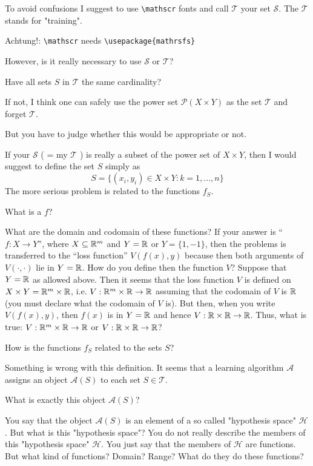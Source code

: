 \begin{description}[style=unboxed,leftmargin=0cm,itemsep=3ex]
To avoid confusions I suggest to use \verb!\mathscr! fonts and
call $\mathscr{T}$ your set $\mathcal{S}$.
The $\mathscr{T}$ stands for "training".

Achtung!: \verb!\mathscr! needs \verb!\usepackage{mathrsfs}!

However, is it really necessary to use $\mathcal{S}$ or $\mathscr{T}$?

Have all sets $S$ in $\mathscr{T}$ the same cardinality?

If not, I think one can safely use the power set $\mathscr{P}(X\times Y)$
as the set $\mathscr{T}$ and forget $\mathscr{T}$.

But you have to judge whether this would be appropriate or not.

If your $\mathcal{S}$ ( = my $\mathscr{T}$ ) is really a subset of the
power set of $X\times Y$, then I would suggest to define the set $S$
simply as
$$
S = \{ (x_i,y_i)\in X\times Y : k=1,...,n \}
$$
The more serious problem is related to the functions $f_S$.

What is a  $f$?

What are the domain and codomain of these functions?
If your answer is ``$f:X\to Y$'', where $X\subseteq{\mathbb R }^m$ and $Y={\mathbb R }$ or
$Y=\{1,-1\}$, then the problems is transferred to the ``loss function''
$V(f(x),y)$ because then both arguments of $V(\cdot,\cdot)$ lie in $Y={\mathbb R }$.
How do you define then the function $V$?
Suppose that $Y={\mathbb R }$ as allowed above.
Then it seems that the loss function $V$ is defined on
$X\times Y={\mathbb R }^m\times{\mathbb R }$, i.e. $V:{\mathbb R }^m\times{\mathbb R }\to{\mathbb R }$ assuming that the
codomain of $V$ is ${\mathbb R }$ (you must declare what the codomain of $V$ is).
But then, when you write $V(f(x),y)$, then $f(x)$ is in $Y={\mathbb R }$ and
hence $V:{\mathbb R }\times{\mathbb R }\to{\mathbb R }$.
Thus, what is true: $V:{\mathbb R }^m\times{\mathbb R }\to{\mathbb R }$ or $V:{\mathbb R }\times{\mathbb R }\to{\mathbb R }$?

How is the functions $f_S$ related to the sets $S$?


Something is wrong with this definition. 
It seems that a learning algorithm $\mathcal{A}$ assigns an object
$\mathcal{A}(S)$ to each set $S\in\mathscr{T}$.
          
What is exactly this object $\mathcal{A}(S)$? 

You say that the object $\mathcal{A}(S)$ is an element of a so called
"hypothesis space" $\mathcal{H}$.
But what is this "hypothesis space"?
You do not really describe the members of this "hypothesis space"
$\mathcal{H}$.
You just say that the members of $\mathcal{H}$ are functions.
But what kind of functions? Domain? Range? What do they do these
functions?


\end{description}
